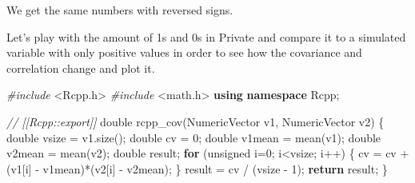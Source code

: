 \documentclass[]{article}
\newenvironment{Shaded}{\begin{snugshade}}{\end{snugshade}}
\newcommand{\CommentTok}[1]{\textcolor[rgb]{0.56,0.35,0.01}{\textit{#1}}}
\newcommand{\ControlFlowTok}[1]{\textcolor[rgb]{0.13,0.29,0.53}{\textbf{#1}}}
\newcommand{\DataTypeTok}[1]{\textcolor[rgb]{0.13,0.29,0.53}{#1}}
\newcommand{\DecValTok}[1]{\textcolor[rgb]{0.00,0.00,0.81}{#1}}
\newcommand{\ImportTok}[1]{#1}
\newcommand{\KeywordTok}[1]{\textcolor[rgb]{0.13,0.29,0.53}{\textbf{#1}}}
\newcommand{\NormalTok}[1]{#1}
\newcommand{\PreprocessorTok}[1]{\textcolor[rgb]{0.56,0.35,0.01}{\textit{#1}}}
\begin{document}
We get the same numbers with reversed signs.

\newpage

Let's play with the amount of 1s and 0s in Private and compare it to a
simulated variable with only positive values in order to see how the
covariance and correlation change and plot it.

\begin{Shaded}
\begin{Highlighting}[]
\PreprocessorTok{#include }\ImportTok{<Rcpp.h>}
\PreprocessorTok{#include }\ImportTok{<math.h>}
\KeywordTok{using} \KeywordTok{namespace}\NormalTok{ Rcpp;}

\CommentTok{// [[Rcpp::export]]}
\DataTypeTok{double}\NormalTok{ rcpp_cov(NumericVector v1, NumericVector v2) \{}
    \DataTypeTok{double}\NormalTok{ vsize = v1.size();}
    \DataTypeTok{double}\NormalTok{ cv = }\DecValTok{0}\NormalTok{;}
    \DataTypeTok{double}\NormalTok{ v1mean = mean(v1);}
    \DataTypeTok{double}\NormalTok{ v2mean = mean(v2);}
    \DataTypeTok{double}\NormalTok{ result;}
    \ControlFlowTok{for}\NormalTok{ (}\DataTypeTok{unsigned}\NormalTok{ i=}\DecValTok{0}\NormalTok{; i<vsize; i++) \{}
\NormalTok{        cv = cv + (v1[i] - v1mean)*(v2[i] - v2mean);}
\NormalTok{    \}}
\NormalTok{    result = cv / (vsize - }\DecValTok{1}\NormalTok{);}
    \ControlFlowTok{return}\NormalTok{ result;}
\NormalTok{\}}
\end{Highlighting}
\end{Shaded}
\end{document}
